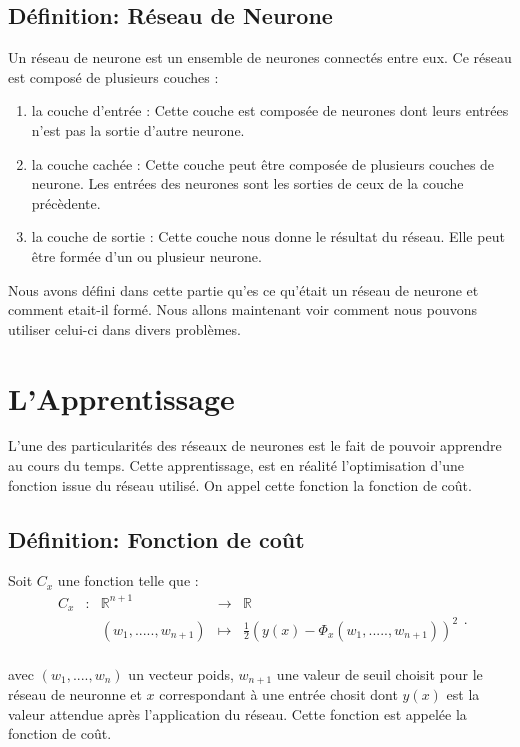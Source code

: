 \documentclass{article}
\newcommand{\fonction}[5]{
	\begin{array}{ccccc}
#1 & : & #2 & \to & #3\\
	& & #4 & \mapsto & #5\\ 
	\end{array}
}
\begin{document}
	\subsection{Définition: Réseau de Neurone}
 	Un réseau de neurone est un ensemble de neurones connectés entre eux. Ce réseau est composé de plusieurs couches : 
	\begin{enumerate}	
		\item la couche d'entrée : Cette couche est composée de neurones dont leurs entrées n'est pas la sortie d'autre neurone. 
		\item la couche cachée : Cette couche peut être composée de plusieurs couches de neurone. Les entrées des neurones sont les sorties de ceux de la couche précèdente.
		\item la couche de sortie : Cette couche nous donne le résultat du réseau. Elle peut être formée d'un ou plusieur neurone.
	\end{enumerate}		
		
	Nous avons défini dans cette partie qu'es ce qu'était un réseau de neurone et comment etait-il formé. Nous allons maintenant voir comment nous pouvons utiliser celui-ci dans divers problèmes. 
	
	
\section{L'Apprentissage}	
L'une des particularités des réseaux de neurones est le fait de pouvoir apprendre au cours du temps. Cette apprentissage, est en réalité l'optimisation d'une fonction issue du réseau utilisé. On appel cette fonction la fonction de coût. \\
 
	\subsection{Définition: Fonction de coût}
		Soit $C_{x}$ une fonction telle que :	
		  \[ \fonction{C_{x}}{\mathbb{R}^{n+1}}{\mathbb{R}}{(w_1,.....,w_{n+1})}{\frac{1}{2}(y(x)-\Phi_{x}(w_1,.....,w_{n+1}))^{2}}. \]

		avec $(w_1,....,w_n)$ un vecteur poids, $w_{n+1}$ une valeur de seuil choisit pour le réseau de neuronne et $x$ correspondant à une entrée chosit dont $y(x)$ est la valeur attendue après l'application du réseau. Cette fonction est appelée la fonction de coût. \\
\end{document}
